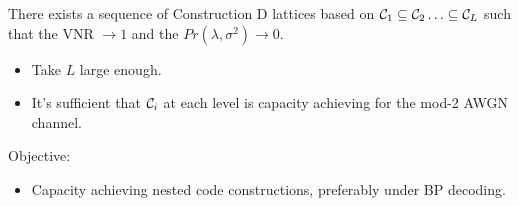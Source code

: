 \documentclass[10pt]{beamer}
\begin{document}
\begin{frame}
        \begin{theorem}
There exists a sequence of Construction D lattices based on $\mathcal{C}_{1}\subseteq \mathcal{C}_{2}\ldots \subseteq \mathcal{C}_{L}$ such that the VNR $\rightarrow 1$ and the $Pr(\lambda,\sigma^{2})\rightarrow 0$.
       \end{theorem}

\begin{itemize}
\item Take $L$ large enough.
\item It's sufficient that $\mathcal{C}_{i}$ at each level is capacity achieving for the mod-2 AWGN channel.
\end{itemize}
\pause
\vspace{0.4in}
Objective:
\begin{itemize}
\item Capacity achieving nested code constructions, preferably under BP decoding.
\end{itemize}
\end{frame}
\end{document}
